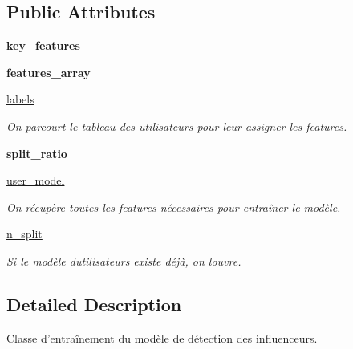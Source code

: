 \subsection*{Public Attributes}
\begin{DoxyCompactItemize}
\item 
\mbox{\label{classtrain_1_1_trainer_a04604b66388b32e9a6c0ba8c534c13e6}} 
{\bfseries key\+\_\+features}
\item 
\mbox{\label{classtrain_1_1_trainer_a629ccd643b7db8dd8b6a06f67f39a0cc}} 
{\bfseries features\+\_\+array}
\item 
\mbox{\hyperlink{classtrain_1_1_trainer_ad50e395082044b5360a36a05228214e3}{labels}}
\begin{DoxyCompactList}\small\item\em On parcourt le tableau des utilisateurs pour leur assigner les features. \end{DoxyCompactList}\item 
\mbox{\label{classtrain_1_1_trainer_ae77281ef8fd3170ab70fe27b3fb6ccb7}} 
{\bfseries split\+\_\+ratio}
\item 
\mbox{\hyperlink{classtrain_1_1_trainer_adb7df426e58f065bdcdfd9289b5b779b}{user\+\_\+model}}
\begin{DoxyCompactList}\small\item\em On récupère toutes les features nécessaires pour entraîner le modèle. \end{DoxyCompactList}\item 
\mbox{\hyperlink{classtrain_1_1_trainer_ac54aaf4028ad0a283506e27d2b7f8118}{n\+\_\+split}}
\begin{DoxyCompactList}\small\item\em Si le modèle d\textquotesingle{}utilisateurs existe déjà, on l\textquotesingle{}ouvre. \end{DoxyCompactList}\end{DoxyCompactItemize}


\subsection{Detailed Description}
\begin{DoxyVerb}Classe d'entraînement du modèle de détection des influenceurs.
\end{DoxyVerb}
 

